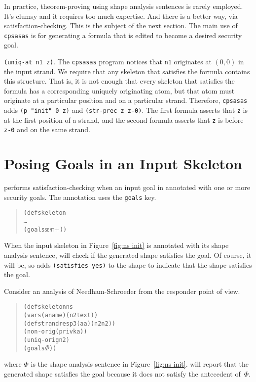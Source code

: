 \documentclass[12pt]{article}
\begin{document}
In practice, theorem-proving using shape analysis sentences is rarely
employed.  It's clumsy and it requires too much expertise.  And there
is a better way, via satisfaction-checking.  This is the subject of
the next section.  The main use of \texttt{cpsasas} is for generating
a formula that is edited to become a desired security goal.

\texttt{(uniq-at n1 z)}.  The \texttt{cpsasas} program notices that
\texttt{n1} originates at $(0,0)$ in the input strand.  We require
that any skeleton that satisfies the formula contains this structure.
That is, it is not enough that every skeleton that satisfies the
formula has a corresponding uniquely originating atom, but that atom
must originate at a particular position and on a particular strand.
Therefore, \texttt{cpsasas} adds \texttt{(p "init" 0 z)} and
\texttt{(str-prec z z-0)}.  The first formula asserts that \texttt{z}
is at the first position of a strand, and the second formula asserts
that \texttt{z} is before \texttt{z-0} and on the same strand.

\section{Posing Goals in an Input Skeleton}\label{sec:posing}

{\cpsa} performs satisfaction-checking when an input goal in annotated
with one or more security goals.  The annotation uses the
\texttt{goals} key.

\begin{quote}
  \begin{alltt}
(defskeleton
   \ldots
   (goals \textsc{sent\ensuremath{+}}))
  \end{alltt}
\end{quote}

When the input skeleton in Figure~\ref{fig:ns init} is annotated with
its shape analysis sentence, {\cpsa} will check if the generated shape
satisfies the goal.  Of course, it will be, so {\cpsa} adds
\texttt{(satisfies yes)} to the shape to indicate that the shape
satisfies the goal.

Consider an analysis of Needham-Schroeder from the responder point of view.
\begin{quote}
  \begin{alltt}
(defskeleton ns
  (vars (a name) (n2 text))
  (defstrand resp 3 (a a) (n2 n2))
  (non-orig (privk a))
  (uniq-orig n2)
  (goals \(\Phi\)))
  \end{alltt}
\end{quote}
where \(\Phi\) is the shape analysis sentence in Figure~\ref{fig:ns
  init}.  {\cpsa} will report that the generated shape satisfies the
goal because it does not satisfy the antecedent of~\(\Phi\).
\end{document}
